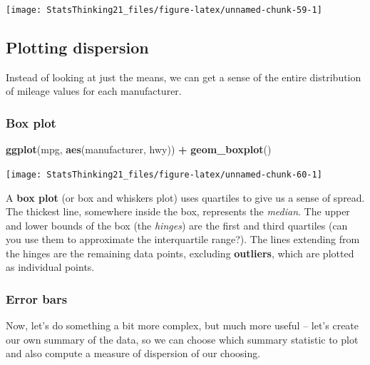 \documentclass[12pt,]{book}
\newenvironment{Shaded}{\begin{snugshade}}{\end{snugshade}}
\newcommand{\KeywordTok}[1]{\textcolor[rgb]{0.13,0.29,0.53}{\textbf{#1}}}
\newcommand{\NormalTok}[1]{#1}
\newcommand{\OperatorTok}[1]{\textcolor[rgb]{0.81,0.36,0.00}{\textbf{#1}}}
\newcommand{\StringTok}[1]{\textcolor[rgb]{0.31,0.60,0.02}{#1}}
\begin{document}
\texttt{[image: StatsThinking21\_files/figure-latex/unnamed-chunk-59-1]}

\hypertarget{plotting-dispersion}{%
\subsection{Plotting dispersion}\label{plotting-dispersion}}

Instead of looking at just the means, we can get a sense of the entire distribution of mileage values for each manufacturer.

\hypertarget{box-plot}{%
\subsubsection{Box plot}\label{box-plot}}

\begin{Shaded}
\begin{Highlighting}[]
\KeywordTok{ggplot}\NormalTok{(mpg, }\KeywordTok{aes}\NormalTok{(manufacturer, hwy)) }\OperatorTok{+}
\StringTok{  }\KeywordTok{geom_boxplot}\NormalTok{()}
\end{Highlighting}
\end{Shaded}

\texttt{[image: StatsThinking21\_files/figure-latex/unnamed-chunk-60-1]}

A \textbf{box plot} (or box and whiskers plot) uses quartiles to give us a sense of spread. The thickest line, somewhere inside the box, represents the \emph{median}. The upper and lower bounds of the box (the \emph{hinges}) are the first and third quartiles (can you use them to approximate the interquartile range?). The lines extending from the hinges are the remaining data points, excluding \textbf{outliers}, which are plotted as individual points.

\hypertarget{error-bars}{%
\subsubsection{Error bars}\label{error-bars}}

Now, let's do something a bit more complex, but much more useful -- let's create our own summary of the data, so we can choose which summary statistic to plot and also compute a measure of dispersion of our choosing.
\end{document}
